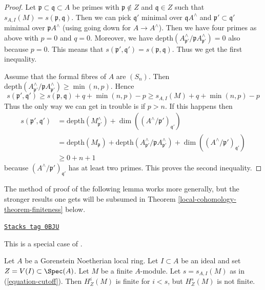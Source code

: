 \begin{proof}
\medskip\noindent
Let $\mathfrak p \subset \mathfrak q \subset A$ be primes
with $\mathfrak p \not \in Z$ and $\mathfrak q \in Z$ such that
$s_{A, I}(M) = s(\mathfrak p, \mathfrak q)$.
Then we can pick $\mathfrak q'$ minimal over $\mathfrak q A^\wedge$
and $\mathfrak p' \subset \mathfrak q'$ minimal over
$\mathfrak p A^\wedge$ (using going down for $A \to A^\wedge$).
Then we have four primes as above with $p = 0$ and $q = 0$.
Moreover, we have
$\text{depth}(A^\wedge_{\mathfrak p'} / \mathfrak p A^\wedge_{\mathfrak p'})=0$
also because $p = 0$. This means that
$s(\mathfrak p', \mathfrak q') = s(\mathfrak p, \mathfrak q)$.
Thus we get the first inequality.

\medskip\noindent
Assume that the formal fibres of $A$ are $(S_n)$. Then
$\text{depth}(A^\wedge_{\mathfrak p'} / \mathfrak p A^\wedge_{\mathfrak p'})
\geq \min(n, p)$.
Hence
$$
s(\mathfrak p', \mathfrak q') \geq
s(\mathfrak p, \mathfrak q) + q + \min(n, p) - p \geq
s_{A, I}(M) + q + \min(n, p) - p
$$
Thus the only way we can get in trouble is if $p > n$. If this happens
then
\begin{align*}
s(\mathfrak p', \mathfrak q')
& =
\text{depth}(M^\wedge_{\mathfrak p'}) +
\dim((A^\wedge/\mathfrak p')_{\mathfrak q'}) \\
& =
\text{depth}(M_\mathfrak p) +
\text{depth}(A^\wedge_{\mathfrak p'} / \mathfrak p A^\wedge_{\mathfrak p'}) +
\dim((A^\wedge/\mathfrak p')_{\mathfrak q'}) \\
& \geq
0 + n + 1
\end{align*}
because $(A^\wedge/\mathfrak p')_{\mathfrak q'}$ has at least two primes.
This proves the second inequality.
\end{proof}

The method of proof of the following lemma works more generally,
but the stronger results one gets will be subsumed in
Theorem \ref{local-cohomology-theorem-finiteness} below.

\begin{lemma}
\label{local-cohomology-lemma-local-annihilator}
\href{https://stacks.math.columbia.edu/tag/0BJU}{\texttt{Stacks tag 0BJU}}

\begin{reference}
This is a special case of
\cite[Satz 1]{Faltings-annulators}.
\end{reference}
Let $A$ be a Gorenstein Noetherian local ring. Let $I \subset A$
be an ideal and set $Z = V(I) \subset \Spec(A)$.
Let $M$ be a finite $A$-module. Let $s = s_{A, I}(M)$ as in
(\ref{equation-cutoff}). Then $H^i_Z(M)$ is finite for $i < s$,
but $H^s_Z(M)$ is not finite.
\end{lemma}

